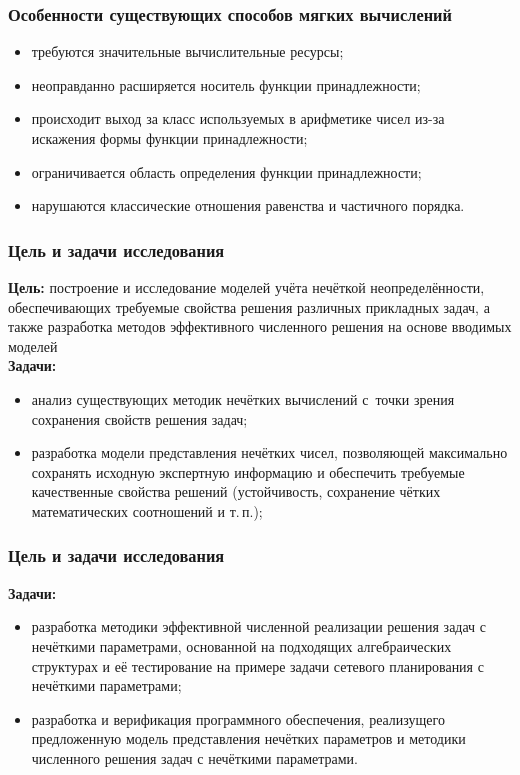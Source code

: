 \documentclass[12pt]{beamer}
\begin{document}

\begin{frame}
  \frametitle{Особенности существующих способов мягких вычислений}
  \begin{itemize}
    \item требуются значительные вычислительные ресурсы;
    \item неоправданно расширяется носитель функции принадлежности;
    \item происходит выход за класс используемых в арифметике чисел из-за искажения формы функции принадлежности;
    \item ограничивается область определения функции принадлежности;
    \item нарушаются классические отношения равенства и частичного порядка.
  \end{itemize}
\end{frame}


\begin{frame}
  \frametitle{Цель и задачи исследования}
  \textbf{Цель:} построение и исследование моделей учёта нечёткой неопределённости, обеспечивающих требуемые свойства решения различных прикладных задач, а также разработка методов эффективного численного решения на основе вводимых моделей \\
  \textbf{Задачи:}
  \begin{itemize}
    \item анализ существующих методик нечётких вычислений с~точки зрения сохранения свойств решения задач;
    \item разработка модели представления нечётких чисел, позволяющей максимально сохранять исходную экспертную информацию и обеспечить требуемые качественные свойства решений (устойчивость, сохранение чётких математических соотношений и т.\,п.);
  \end{itemize}  
\end{frame}


\begin{frame}
  \frametitle{Цель и задачи исследования}
  \textbf{Задачи:}
  \begin{itemize}
    \item разработка методики эффективной численной реализации решения задач с нечёткими параметрами, основанной на подходящих алгебраических структурах и её тестирование на примере задачи сетевого планирования с нечёткими параметрами;
    \item разработка и верификация программного обеспечения, реализущего предложенную модель представления нечётких параметров и методики численного решения задач с нечёткими параметрами.
  \end{itemize}  
\end{frame}
\end{document}
